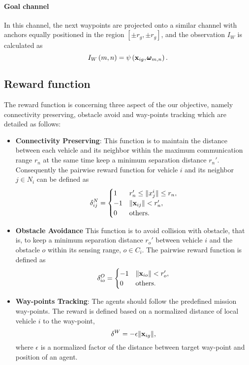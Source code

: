 \documentclass[letterpaper,10 pt,conference]{ieeeconf}
\begin{document}
\paragraph{Goal channel} In this channel, the next waypoints are projected onto a similar channel with anchors equally positioned in the region $\left[\pm r_g,\pm r_g\right]$, and the observation $I_W$ is calculated as
\begin{equation}
I_W\left(m,n\right) = \psi\left(\mathbf{x}_{ig},\pmb\omega_{m,n}\right).
\end{equation}
\subsection{Reward function}
The reward function is concerning three aspect of the our objective, namely connectivity preserving, obstacle avoid and way-points tracking which are detailed as follows:
\begin{itemize}
	\item{\bf{Connectivity Preserving}}:
	This function is to maintain the distance between each vehicle and its neighbor within the maximum communication range $r_n$ at the same time keep a minimum separation distance $r_n'$. Consequently the pairwise reward function for vehicle $i$ and its neighbor $j\in N_i$ can be defined as
	\begin{equation}
	\delta^N_{ij} = 
	\begin{cases}
	1 & r_n' \le \|x_j^i\|\le r_n, \\
	-1 & \|\mathbf{x}_{ij}\| < r_n',\\
	0 & \rm{others}.
	\end{cases}
	\end{equation}
	\item{\bf{Obstacle Avoidance}} This function is to avoid collision with obstacle, that is, to keep a minimum separation distance $r_o'$ between vehicle $i$ and the obstacle $o$ within its sensing range, $o\in C_i$. The pairwise reward function is defined as
	\begin{equation}
	\delta^O_{io} = 
	\begin{cases}
	-1 & \|\mathbf{x}_{io}\| < r_o',\\
	0 & \rm{others}.
	\end{cases}
	\end{equation}
	\item{\bf{Way-points Tracking}}: The agents should follow the predefined mission way-points. The reward is defined based on a normalized distance of local vehicle $i$ to the way-point,
	\begin{equation}
	\delta^W = -{\epsilon\|\mathbf{x}_{ig}\|},
	\end{equation}
	where $\epsilon$ is a normalized factor of the distance between target way-point and position of an agent. 
\end{itemize}
\end{document}
